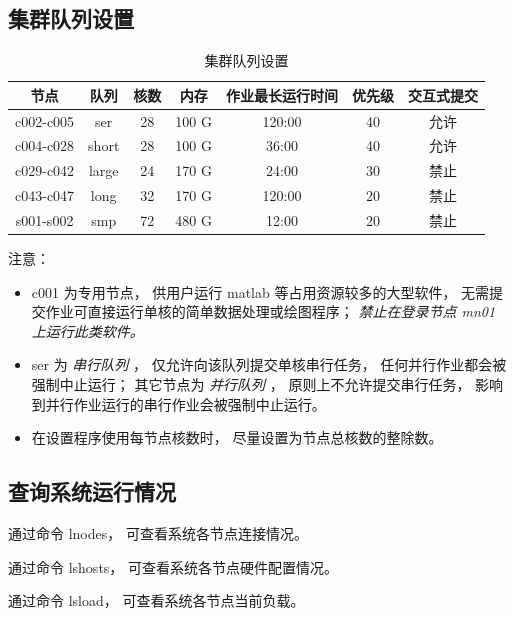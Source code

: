 \documentclass[UTF8]{ctexart}
\newcommand{\myem}[1]{{\color{red}\em #1}}
\newcommand{\mynote}[1]{\colorbox{gray!35}{#1}}
\newcommand{\mynnote}[1]{\colorbox{gray!15}{\color{blue!65}#1}}
\begin{document}
\subsection{集群队列设置}
\begin{table}[h]
  \centering
  \caption{集群队列设置}
  \begin{tabular*}{400pt}{@{\extracolsep{\fill}}ccccccc}
    \toprule
    节点      & 队列  & 核数 & 内存  & 作业最长运行时间 & 优先级 & 交互式提交 \\
    \midrule
    c002-c005 & ser   & 28   & 100 G  & 120:00 & 40 & 允许 \\
    c004-c028 & short & 28   & 100 G  & 36:00  & 40 & 允许 \\
    c029-c042 & large & 24   & 170 G  & 24:00  & 30 & 禁止 \\
    c043-c047 & long  & 32   & 170 G  & 120:00 & 20 & 禁止 \\
    s001-s002 & smp   & 72   & 480 G  & 12:00  & 20 & 禁止 \\
    \bottomrule
  \end{tabular*}
\end{table}

注意：
\begin{itemize}
  \setlength{\itemsep}{0pt}
  \setlength{\parsep}{0pt}
  \setlength{\parskip}{0pt}

  \item \mynote{c001} 为专用节点，
  供用户运行 matlab 等占用资源较多的大型软件，
  无需提交作业可直接运行单核的简单数据处理或绘图程序；
  \myem{禁止在登录节点 \mynote{\rm mn01} 上运行此类软件。}

  \item \mynote{ser} 为 \myem{串行队列} ，
  仅允许向该队列提交单核串行任务，
  任何并行作业都会被强制中止运行；
  其它节点为 \myem{并行队列} ，
  原则上不允许提交串行任务，
  影响到并行作业运行的串行作业会被强制中止运行。

  \item 在设置程序使用每节点核数时，
  尽量设置为节点总核数的整除数。
\end{itemize}

\subsection{查询系统运行情况}
通过命令 \mynnote{lnodes}，
可查看系统各节点连接情况。

通过命令 \mynnote{lshosts}，
可查看系统各节点硬件配置情况。

通过命令 \mynnote{lsload}，
可查看系统各节点当前负载。
\end{document}
